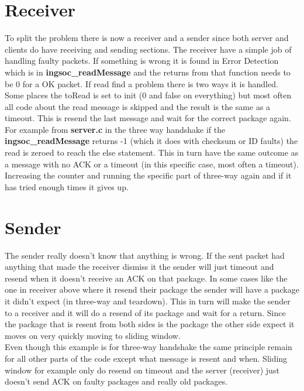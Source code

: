 \section{Receiver}\label{sec:receiver}
To split the problem there is now a receiver and a sender since both server and clients do have receiving and sending sections.
The receiver have a simple job of handling faulty packets. If something is wrong it is found in Error Detection which is in \textbf{ingsoc\_readMessage} and the returns from that function needs to be 0 for a OK packet. If read find a problem there is two ways it is handled. Some places the toRead is set to init (0 and false on everything) but most often all code about the read message is skipped and the result is the same as a timeout. This is resend the last message and wait for the correct package again.\\
For example from \textbf{server.c} in the three way handshake if the \textbf{ingsoc\_readMessage} returns -1 (which it does with checksum or ID faults) the read is zeroed to reach the else statement. This in turn have the same outcome as a message with no ACK or a timeout (in this specific case, most often a timeout). Increasing the counter and running the specific part of three-way again and if it has tried enough times it gives up.


\section{Sender}\label{sec:sender}
The sender really doesn't know that anything is wrong. If the sent packet had anything that made the receiver dismiss it the sender will just timeout and resend when it doesn't receive an ACK on that package. In some cases like the one in receiver above where it resend their package the sender will have a package it didn't expect (in three-way and teardown). This in turn will make the sender to a receiver and it will do a resend of its package and wait for a return. Since the package that is resent from both sides is the package the other side expect it moves on very quickly moving to sliding window.\\
Even though this example is for three-way handshake the same principle remain for all other parts of the code except what message is resent and when. Sliding window for example only do resend on timeout and the server (receiver) just doesn't send ACK on faulty packages and really old packages. 

